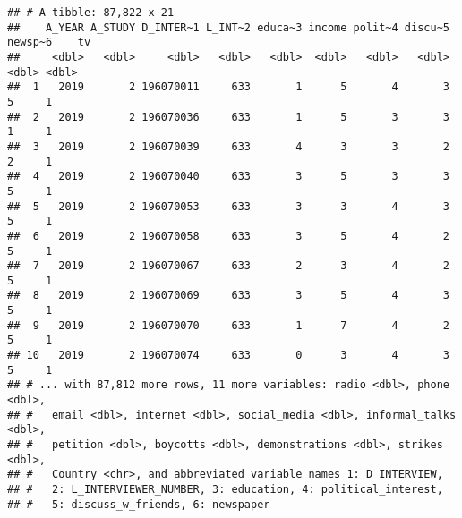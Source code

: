 \documentclass[
]{article}
\begin{document}
\begin{verbatim}
## # A tibble: 87,822 x 21
##    A_YEAR A_STUDY D_INTER~1 L_INT~2 educa~3 income polit~4 discu~5 newsp~6    tv
##     <dbl>   <dbl>     <dbl>   <dbl>   <dbl>  <dbl>   <dbl>   <dbl>   <dbl> <dbl>
##  1   2019       2 196070011     633       1      5       4       3       5     1
##  2   2019       2 196070036     633       1      5       3       3       1     1
##  3   2019       2 196070039     633       4      3       3       2       2     1
##  4   2019       2 196070040     633       3      5       3       3       5     1
##  5   2019       2 196070053     633       3      3       4       3       5     1
##  6   2019       2 196070058     633       3      5       4       2       5     1
##  7   2019       2 196070067     633       2      3       4       2       5     1
##  8   2019       2 196070069     633       3      5       4       3       5     1
##  9   2019       2 196070070     633       1      7       4       2       5     1
## 10   2019       2 196070074     633       0      3       4       3       5     1
## # ... with 87,812 more rows, 11 more variables: radio <dbl>, phone <dbl>,
## #   email <dbl>, internet <dbl>, social_media <dbl>, informal_talks <dbl>,
## #   petition <dbl>, boycotts <dbl>, demonstrations <dbl>, strikes <dbl>,
## #   Country <chr>, and abbreviated variable names 1: D_INTERVIEW,
## #   2: L_INTERVIEWER_NUMBER, 3: education, 4: political_interest,
## #   5: discuss_w_friends, 6: newspaper
\end{verbatim}
\end{document}
